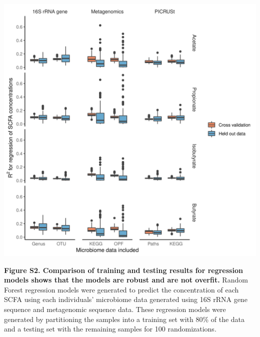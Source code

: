 \documentclass[11pt,]{article}
\begin{document}
\includegraphics{figure_s2.png}

\textbf{Figure S2. Comparison of training and testing results for
regression models shows that the models are robust and are not overfit.}
Random Forest regression models were generated to predict the
concentration of each SCFA using each individuals' microbiome data
generated using 16S rRNA gene sequence and metagenomic sequence data.
These regression models were generated by partitioning the samples into
a training set with 80\% of the data and a testing set with the
remaining samples for 100 randomizations.
\end{document}
